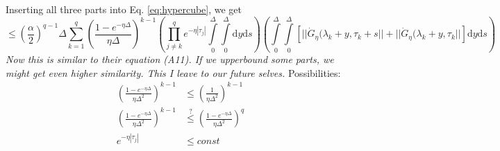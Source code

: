 \documentclass{article}
\renewcommand{\d}{\mathrm{d}}
\begin{document}
Inserting all three parts into Eq. \ref{eq:hypercube}, we get
\begin{equation}
   \leq \left(\frac{\alpha}{2}\right)^{q-1} \Delta\sum_{k=1}^q \left(\frac{1-e^{-\eta\Delta}}{\eta\Delta}\right)^{k-1} 
    \left(
        \prod_{j\neq k}^q e^{-\eta|\tau_j|}\int\limits_0^\Delta\int\limits_0^\Delta  \d y \d s 
    \right)
    \left(
         \int\limits_0^\Delta \int\limits_0^\Delta 
    \left[ 
        ||\dot G_\eta(\lambda_k+y,\tau_k+s|| + ||\dot G_\eta(\lambda_k+y,\tau_k||
    \right]\d y \d s
    \right)
\end{equation}
\textit{Now this is similar to their equation (A11). If we upperbound some parts, we might get even higher similarity. This I leave to our future selves.}
Possibilities:
\begin{align}
    \left(\frac{1-e^{-\eta\Delta}}{\eta\Delta^2}\right)^{k-1} & \leq \left(\frac{1}{\eta\Delta^2}\right)^{k-1} \\
    \left(\frac{1-e^{-\eta\Delta}}{\eta\Delta^2}\right)^{k-1} & \overset{?}{\leq}\left(\frac{1-e^{-\eta\Delta}}{\eta\Delta^2}\right)^q\\
    e^{-\eta|\tau_j|} &\leq const
\end{align}



\end{document}
